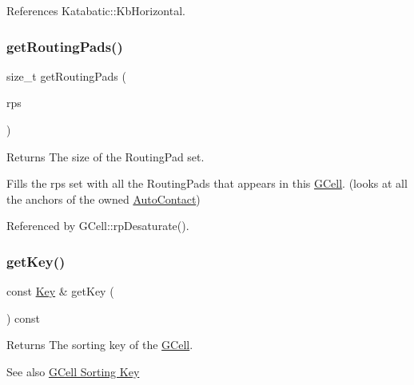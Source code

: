 References Katabatic\+::\+Kb\+Horizontal.

\mbox{\label{classKatabatic_1_1GCell_a3bda8c3dbb2896a0e6e57f974d0c1cad}} 
\subsubsection{\texorpdfstring{get\+Routing\+Pads()}{getRoutingPads()}}
{\footnotesize\ttfamily size\+\_\+t get\+Routing\+Pads (\begin{DoxyParamCaption}\item[{set$<$ \textbf{ Routing\+Pad} $\ast$$>$ \&}]{rps }\end{DoxyParamCaption})}

\begin{DoxyReturn}{Returns}
The size of the Routing\+Pad set.
\end{DoxyReturn}
Fills the {\ttfamily rps} set with all the Routing\+Pads that appears in this \hyperlink{classKatabatic_1_1GCell}{G\+Cell}. (looks at all the anchors of the owned \hyperlink{classKatabatic_1_1AutoContact}{Auto\+Contact}) 

Referenced by G\+Cell\+::rp\+Desaturate().

\mbox{\label{classKatabatic_1_1GCell_ade1e79e88bf4f4c173ffd083dd5470c9}} 
\subsubsection{\texorpdfstring{get\+Key()}{getKey()}}
{\footnotesize\ttfamily const \hyperlink{classKatabatic_1_1GCell_1_1Key}{Key} \& get\+Key (\begin{DoxyParamCaption}{ }\end{DoxyParamCaption}) const\hspace{0.3cm}{\ttfamily [inline]}}

\begin{DoxyReturn}{Returns}
The sorting key of the \hyperlink{classKatabatic_1_1GCell}{G\+Cell}.
\end{DoxyReturn}
\begin{DoxySeeAlso}{See also}
\hyperlink{classKatabatic_1_1GCell_secGCellSortingKey}{G\+Cell Sorting Key} 
\end{DoxySeeAlso}


